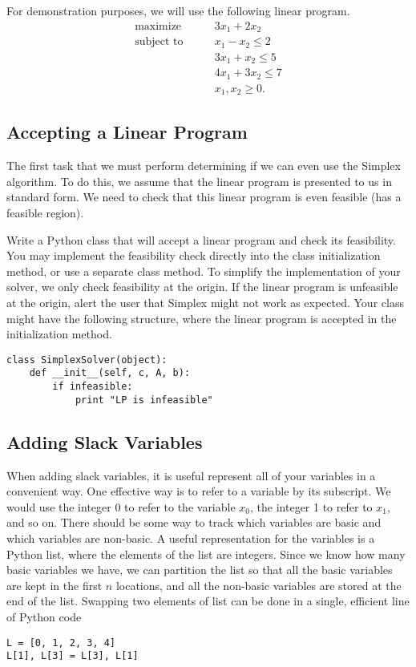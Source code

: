 For demonstration purposes, we will use the following linear program.
\begin{align*}
\text{maximize}\qquad & 3x_1 + 2x_2 \\
\text{subject to}\qquad 
& x_1 - x_2 \leq 2 \\
& 3x_1 + x_2 \leq 5 \\
& 4x_1 + 3x_2 \leq 7 \\
& x_1, x_2 \geq 0.
\end{align*}

\subsection{Accepting a Linear Program}
The first task that we must perform determining if we can even use the Simplex algorithm.
To do this, we assume that the linear program is presented to us in standard form.
We need to check that this linear program is even feasible (has a feasible region).

\begin{problem}
Write a Python class that will accept a linear program and check its feasibility.
You may implement the feasibility check directly into the class initialization method, or use a separate class method.
To simplify the implementation of your solver, we only check feasibility at the origin.
If the linear program is unfeasible at the origin, alert the user that Simplex might not work as expected.
Your class might have the following structure, where the linear program is accepted in the initialization method.
\begin{lstlisting}
class SimplexSolver(object):
    def __init__(self, c, A, b):
        if infeasible:
            print "LP is infeasible"
\end{lstlisting}
\label{prob:initsolver}
\end{problem}

\subsection{Adding Slack Variables}
When adding slack variables, it is useful represent all of your variables in a convenient way.
One effective way is to refer to a variable by its subscript.  
We would use the integer 0 to refer to the variable $x_0$, the integer 1 to refer to $x_1$, and so on.
There should be some way to track which variables are basic and which variables are non-basic.
A useful representation for the variables is a Python list, where the elements of the list are integers.
Since we know how many basic variables we have, we can partition the list so that all the basic variables are kept in the first $n$ locations, and all the non-basic variables are stored at the end of the list.
Swapping two elements of list can be done in a single, efficient line of Python code
\begin{lstlisting}
L = [0, 1, 2, 3, 4]
L[1], L[3] = L[3], L[1]
\end{lstlisting}

